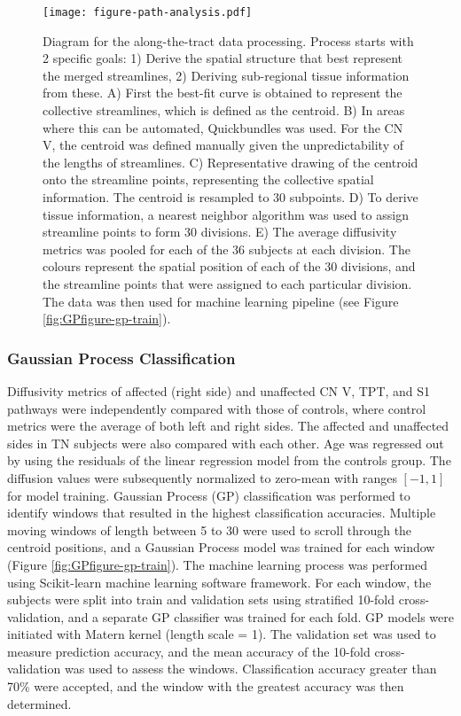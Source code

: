 \begin{figure}[ht]
\centering
\texttt{[image: figure-path-analysis.pdf]}
\caption[Diagram for the along-the-tract data processing.]{Diagram for the along-the-tract data processing.
Process starts with 2 specific goals: 1) Derive the spatial structure that best represent the merged streamlines, 2) Deriving sub-regional tissue information from these. A) First the best-fit curve is obtained to represent the collective streamlines, which is defined as the centroid. B) In areas where this can be automated, Quickbundles was used. For the CN V, the centroid was defined manually given the unpredictability of the lengths of streamlines. C) Representative drawing of the centroid onto the streamline points, representing the collective spatial information. The centroid is resampled to 30 subpoints. D) To derive tissue information, a nearest neighbor algorithm was used to assign streamline points to form 30 divisions. E) The average diffusivity metrics was pooled for each of the 36 subjects at each division. The colours represent the spatial position of each of the 30 divisions, and the streamline points that were assigned to each particular division. The data was then used for machine learning pipeline (see Figure \ref{fig:GPfigure-gp-train}).
}
\label{fig:GPfigure-method-centroid}
\end{figure}

\subsubsection{Gaussian Process Classification}

Diffusivity metrics of affected (right side) and unaffected CN V, TPT, and S1 pathways were independently compared with those of controls, where control metrics were the average of both left and right sides. The affected and unaffected sides in TN subjects were also compared with each other. 
Age was regressed out by using the residuals of the linear regression model from the controls group. The diffusion values were subsequently normalized to zero-mean with ranges $[-1, 1]$ for model training. 
Gaussian Process (GP) classification was performed to identify windows that resulted in the highest classification accuracies. Multiple moving windows of length between 5 to 30 were used to scroll through the centroid positions, and a Gaussian Process model was trained for each window (Figure \ref{fig:GPfigure-gp-train}). The machine learning process was performed using Scikit-learn machine learning software framework.
For each window, the subjects were split into train and validation sets using stratified 10-fold cross-validation, and a separate GP classifier was trained for each fold. GP models were initiated with Matern kernel (length scale = 1). The validation set was used to measure prediction accuracy, and the mean accuracy of the 10-fold cross-validation was used to assess the windows. Classification accuracy greater than 70\% were accepted, and the window with the greatest accuracy was then determined. 

